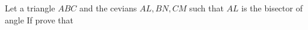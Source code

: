 Let a triangle  $ABC$   and the cevians  $AL, BN , CM$ such that  $AL$  is the  bisector of angle   If   prove that  
